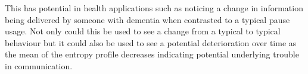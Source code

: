 This has potential in health applications such as noticing a change in information being delivered by someone with dementia when contrasted to a typical pause usage. Not only could this be used to see a change from a typical to typical behaviour but it could also be used to see a potential deterioration over time as the mean of the entropy profile decreases indicating potential underlying trouble in communication. \\



%


